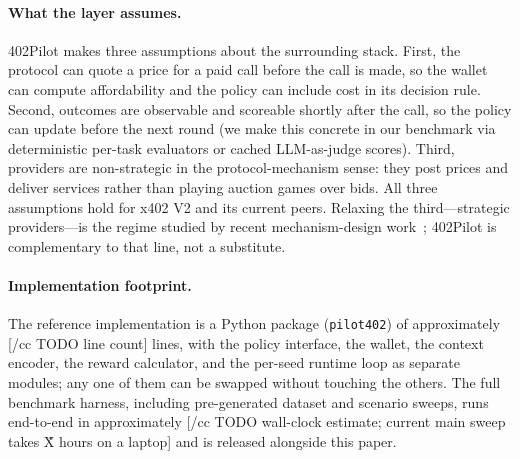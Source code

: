 \paragraph{What the layer assumes.}
402Pilot makes three assumptions about the surrounding stack. First, the protocol can quote a price for a paid call before the call is made, so the wallet can compute affordability and the policy can include cost in its decision rule. Second, outcomes are observable and scoreable shortly after the call, so the policy can update before the next round (we make this concrete in our benchmark via deterministic per-task evaluators or cached LLM-as-judge scores). Third, providers are non-strategic in the protocol-mechanism sense: they post prices and deliver services rather than playing auction games over bids. All three assumptions hold for x402 V2 and its current peers. Relaxing the third---strategic providers---is the regime studied by recent mechanism-design work~\citep{aamas2026reverseauction}; 402Pilot is complementary to that line, not a substitute.

\paragraph{Implementation footprint.}
The reference implementation is a Python package (\texttt{pilot402}) of approximately [/cc TODO line count] lines, with the policy interface, the wallet, the context encoder, the reward calculator, and the per-seed runtime loop as separate modules; any one of them can be swapped without touching the others. The full benchmark harness, including pre-generated dataset and scenario sweeps, runs end-to-end in approximately [/cc TODO wall-clock estimate; current main sweep takes \~X hours on a laptop] and is released alongside this paper.
